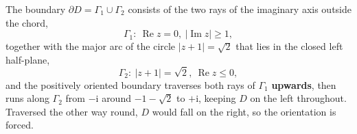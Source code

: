\documentclass[11pt,a4paper]{article}
\theoremstyle{definition}
\theoremstyle{plain}
\begin{document}
The boundary $\partial D = \Gamma_1 \cup \Gamma_2$ consists of the two rays of the imaginary axis outside the chord,
\begin{equation}
\Gamma_1 : \ \operatorname{Re} z = 0, \ |\operatorname{Im} z| \ge 1,
\end{equation}
together with the major arc of the circle $|z + 1| = \sqrt{2}$ that lies in the closed left half-plane,
\begin{equation}
\Gamma_2 : \ |z + 1| = \sqrt{2}, \ \operatorname{Re} z \le 0,
\end{equation}
and the positively oriented boundary traverses both rays of $\Gamma_1$ \textbf{upwards}, then runs along $\Gamma_2$ from $-\mathrm{i}$ around $-1 - \sqrt{2}$ to $+\mathrm{i}$, keeping $D$ on the left throughout. Traversed the other way round, $D$ would fall on the right, so the orientation is forced.
\end{document}
